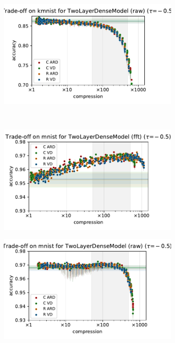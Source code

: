 \documentclass[a4paper,10pt,onecolumn]{article}
\begin{document}
\begin{figure}[b]
\begin{subfigure}[b]{0.5\columnwidth}
  \end{subfigure}%
  \begin{subfigure}[b]{0.5\columnwidth}
    \centering
    \includegraphics[width=\columnwidth]{figure__mnist-like__method_comparison/appendix__TwoLayerDenseModel__kmnist__raw__-0.5.pdf}
  \end{subfigure} \\ %
  \begin{subfigure}[b]{0.5\columnwidth}
    \centering
    \includegraphics[width=\columnwidth]{figure__mnist-like__method_comparison/appendix__TwoLayerDenseModel__mnist__fft__-0.5.pdf}
  \end{subfigure}%
  \begin{subfigure}[b]{0.5\columnwidth}
    \centering
    \includegraphics[width=\columnwidth]{figure__mnist-like__method_comparison/appendix__TwoLayerDenseModel__mnist__raw__-0.5.pdf}

\end{subfigure}
\end{figure}
\end{document}
